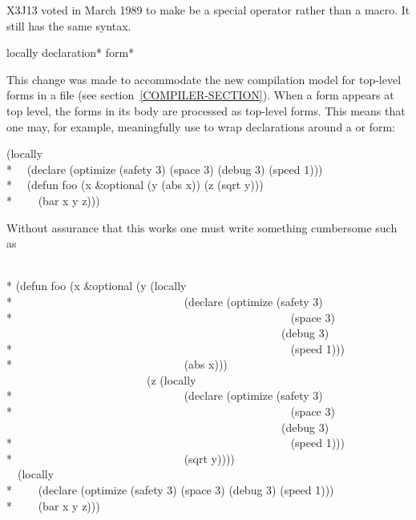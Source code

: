 \begin{newer}
X3J13 voted in March 1989  to make 
be a special operator rather than a macro.  It still has the same syntax.

\begin{defspec}
locally {declaration}* {form}*

This change was made to accommodate the new compilation model for top-level forms
in a file (see section~\ref{COMPILER-SECTION}).
When a  form appears at top level, the forms in its body are
processed as top-level forms.  This means that one may, for example, meaningfully use
 to wrap declarations around a  or  form:
\begin{lisp}
(locally \\*
~~(declare (optimize (safety 3) (space 3) (debug 3) (speed 1))) \\*
~~(defun foo (x \&optional (y (abs x)) (z (sqrt y))) \\*
~~~~(bar x y z)))
\end{lisp}
Without assurance that this works
one must write something cumbersome such as
\begin{lisp}
 \\*
(defun foo (x \&optional (y (locally \\*
~~~~~~~~~~~~~~~~~~~~~~~~~~~~~~(declare (optimize (safety 3) \\*
~~~~~~~~~~~~~~~~~~~~~~~~~~~~~~~~~~~~~~~~~~~~~~~~~(space 3) \\
~~~~~~~~~~~~~~~~~~~~~~~~~~~~~~~~~~~~~~~~~~~~~~~~~(debug 3) \\*
~~~~~~~~~~~~~~~~~~~~~~~~~~~~~~~~~~~~~~~~~~~~~~~~~(speed 1))) \\*
~~~~~~~~~~~~~~~~~~~~~~~~~~~~~~(abs x))) \\
~~~~~~~~~~~~~~~~~~~~~~~~~(z (locally \\*
~~~~~~~~~~~~~~~~~~~~~~~~~~~~~~(declare (optimize (safety 3) \\*
~~~~~~~~~~~~~~~~~~~~~~~~~~~~~~~~~~~~~~~~~~~~~~~~~(space 3) \\
~~~~~~~~~~~~~~~~~~~~~~~~~~~~~~~~~~~~~~~~~~~~~~~~~(debug 3) \\*
~~~~~~~~~~~~~~~~~~~~~~~~~~~~~~~~~~~~~~~~~~~~~~~~~(speed 1))) \\*
~~~~~~~~~~~~~~~~~~~~~~~~~~~~~~(sqrt y)))) \\
~~(locally \\*
~~~~(declare (optimize (safety 3) (space 3) (debug 3) (speed 1))) \\*
~~~~(bar x y z)))
\end{lisp}
\end{defspec}
\end{newer}

